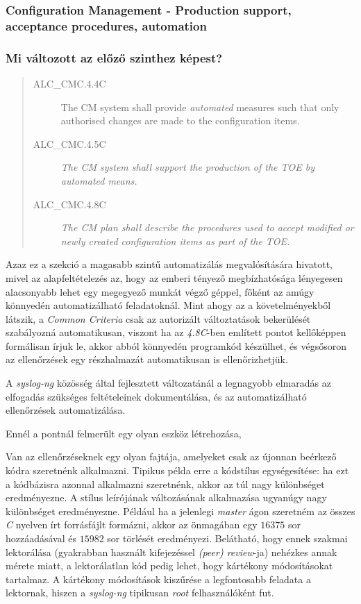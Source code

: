\pagebreak[1]
\subsubsection{Configuration Management - Production support, acceptance procedures, automation}
\subsubsection{Mi változott az előző szinthez képest?}
\begin{quote}
    \begin{description}
        \item[ALC\_CMC.4.4C]{The CM system shall provide \emph{automated} measures such that only
            authorised changes are made to the configuration items.}
        \item[ALC\_CMC.4.5C]{\emph{The CM system shall support the production of the TOE by
            automated means.}}
        \item[ALC\_CMC.4.8C]{\emph{The CM plan shall describe the procedures used to accept
            modified or newly created configuration items as part of the TOE.}}
    \end{description}
\end{quote}
Azaz ez a szekció a magasabb szintű automatizálás megvalósítására hivatott, mivel az alapfeltételezés
az, hogy az emberi tényező megbízhatósága lényegesen alacsonyabb lehet egy megegyező munkát végző
géppel, főként az amúgy könnyedén automatizálható feladatoknál.
Mint ahogy az a követelményekből látszik, a \emph{Common Criteria} csak az autorizált változtatások
bekerülését szabályozná automatikusan, viszont ha az \emph{4.8C}-ben említett pontot kellőképpen
formálisan írjuk le, akkor abból könnyedén programkód készülhet, és végsősoron az ellenőrzések egy
részhalmazát automatikusan is ellenőrizhetjük.

A \emph{syslog-ng} közösség által fejlesztett változatánál a legnagyobb elmaradás az elfogadás
szükséges feltételeinek dokumentálása, és az automatizálható ellenőrzések automatizálása.

Ennél a pontnál felmerült egy olyan eszköz létrehozása, 

Van az ellenőrzéseknek egy olyan fajtája, amelyeket csak az újonnan beérkező kódra szeretnénk
alkalmazni. Tipikus példa erre a kódstílus egységesítése: ha ezt a kódbázisra azonnal alkalmazni
szeretnénk, akkor az túl nagy különbséget eredményezne. A stílus leírójának változásának alkalmazása
ugyanúgy nagy különbséget eredményezne. Például ha a jelenlegi \emph{master} ágon szeretném az
összes \emph{C} nyelven írt forrásfájlt formázni, akkor az önmagában egy $16375$ sor hozzáadásával
és $15982$ sor törlését eredményezi.
Belátható, hogy ennek szakmai lektorálása (gyakrabban használt kifejezéssel \emph{(peer) review}-ja)
nehézkes annak mérete miatt, a lektorálatlan kód pedig lehet, hogy kártékony módosításokat tartalmaz.
A kártékony módosítások kiszűrése a legfontosabb feladata a lektornak, hiszen a \emph{syslog-ng}
tipikusan \emph{root} felhasználóként fut.


